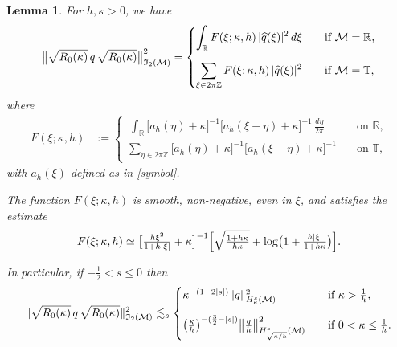 \documentclass[10pt,a4paper]{amsart}
\newtheorem{lemma}{Lemma}
\newcommand{\R}{{\mathbb{R}}}
\newcommand{\T}{{\mathbb{T}}}
\newcommand{\Z}{{\mathbb{Z}}}
\begin{document}
\begin{lemma}\label{L:HS}
For $h,\kappa>0$, we have
\begin{align}\label{I2}
 \bigl\| \sqrt{R_0(\kappa)}\, q\, \sqrt{R_0(\kappa)} \bigr\|_{\mathfrak I_2(\mathcal M)}^2
 = \begin{cases}\displaystyle\int_{\R}  F(\xi;\kappa,h)\, |\widehat q(\xi)|^2\,d\xi &\quad\text{if \(\mathcal M = \R\),}\vspace{1em}\\ \displaystyle\sum_{\xi\in2\pi\Z} F(\xi;\kappa,h)\, |\widehat q(\xi)|^2&\quad\text{if \(\mathcal M = \T\),}\end{cases}
\end{align}
where 
\begin{align}\label{F defn}
 F(\xi;\kappa,h) &:= \begin{cases}
 	\displaystyle\ \int_{\R} \bigl[a_h(\eta) +\kappa\bigr]^{-1}\bigl[a_h(\xi+\eta) + \kappa\bigr]^{-1} \,\tfrac{d\eta}{2\pi}  & \quad\text{on $\R$,}\\[2ex]
	\displaystyle\sum_{\eta\in2\pi\Z} \bigl[a_h(\eta) +\kappa\bigr]^{-1}\bigl[a_h(\xi+\eta) + \kappa\bigr]^{-1} & \quad\text{on $\T$,}
\end{cases}
\end{align}
with \(a_h(\xi)\) defined as in \eqref{symbol}.

The function \(F(\xi;\kappa,h)\) is smooth, non-negative, even in \(\xi\), and satisfies the estimate
\begin{equation}\label{F main bound}
F(\xi;\kappa,h)\simeq \bigl[\tfrac{h\xi^2}{1+h|\xi|} +\kappa\bigr]^{-1}\Bigl[\sqrt{\tfrac{1+h\kappa}{h\kappa}} + \log\bigl(1 + \tfrac{h|\xi|}{1+h\kappa}\bigr)\Bigr].
\end{equation} 

In particular, if $-\frac12<s\leq 0$ then
\begin{align}\label{HS bdd}
 \| \sqrt{R_0(\kappa)}\, q\, \sqrt{R_0(\kappa)}\|_{\mathfrak I_2(\mathcal M)}^2 \lesssim_s\begin{cases} \kappa^{-(1-2|s|)} \|q\|_{H^s_\kappa(\mathcal M)}^2&\quad\text{if \(\kappa>\tfrac1h\),}\vspace{1em}\\\bigl(\tfrac \kappa h\bigr)^{-(\frac32-|s|)}\bigl\|\tfrac qh\bigr\|_{H_{\sqrt{\kappa/h}}^s(\mathcal M)}^2&\quad\text{if \(0<\kappa\leq\tfrac1h\).}\end{cases}
\end{align}


\end{lemma}
\end{document}
